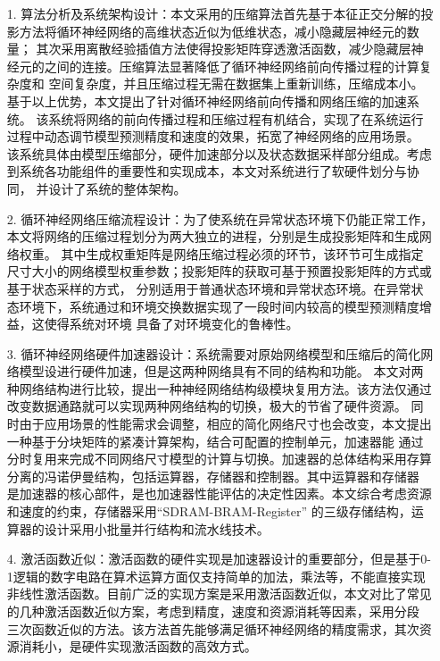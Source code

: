 \begin{itemize}
\vspace{4pt}
\item[1.]算法分析及系统架构设计：本文采用的压缩算法首先基于本征正交分解的投影方法将循环神经网络的高维状态近似为低维状态，减小隐藏层神经元的数量；
其次采用离散经验插值方法使得投影矩阵穿透激活函数，减少隐藏层神经元的之间的连接。压缩算法显著降低了循环神经网络前向传播过程的计算复杂度和
空间复杂度，并且压缩过程无需在数据集上重新训练，压缩成本小。基于以上优势，本文提出了针对循环神经网络前向传播和网络压缩的加速系统。
该系统将网络的前向传播过程和压缩过程有机结合，实现了在系统运行过程中动态调节模型预测精度和速度的效果，拓宽了神经网络的应用场景。
该系统具体由模型压缩部分，硬件加速部分以及状态数据采样部分组成。考虑到系统各功能组件的重要性和实现成本，本文对系统进行了软硬件划分与协同，
并设计了系统的整体架构。
\vspace{4pt}
\item[2.]循环神经网络压缩流程设计：为了使系统在异常状态环境下仍能正常工作，本文将网络的压缩过程划分为两大独立的进程，分别是生成投影矩阵和生成网络权重。
其中生成权重矩阵是网络压缩过程必须的环节，该环节可生成指定尺寸大小的网络模型权重参数；投影矩阵的获取可基于预置投影矩阵的方式或基于状态采样的方式，
分别适用于普通状态环境和异常状态环境。在异常状态环境下，系统通过和环境交换数据实现了一段时间内较高的模型预测精度增益，这使得系统对环境
具备了对环境变化的鲁棒性。

\vspace{4pt}
\item[3.]循环神经网络硬件加速器设计：系统需要对原始网络模型和压缩后的简化网络模型设进行硬件加速，但是这两种网络具有不同的结构和功能。
本文对两种网络结构进行比较，提出一种神经网络结构级模块复用方法。该方法仅通过改变数据通路就可以实现两种网络结构的切换，极大的节省了硬件资源。
同时由于应用场景的性能需求会调整，相应的简化网络尺寸也会改变，本文提出一种基于分块矩阵的紧凑计算架构，结合可配置的控制单元，加速器能
通过分时复用来完成不同网络尺寸模型的计算与切换。加速器的总体结构采用存算分离的冯诺伊曼结构，包括运算器，存储器和控制器。其中运算器和存储器
是加速器的核心部件，是也加速器性能评估的决定性因素。本文综合考虑资源和速度的约束，存储器采用“SDRAM-BRAM-Register”
的三级存储结构，运算器的设计采用小批量并行结构和流水线技术。

\vspace{4pt}
\item[4.]激活函数近似：激活函数的硬件实现是加速器设计的重要部分，但是基于0-1逻辑的数字电路在算术运算方面仅支持简单的加法，乘法等，不能直接实现
非线性激活函数。目前广泛的实现方案是采用激活函数近似，本文对比了常见的几种激活函数近似方案，考虑到精度，速度和资源消耗等因素，采用分段
三次函数近似的方法。该方法首先能够满足循环神经网络的精度需求，其次资源消耗小，是硬件实现激活函数的高效方式。
\vspace{4pt}
\end{itemize}

